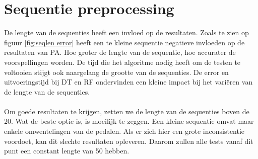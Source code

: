 \section{Sequentie preprocessing}
De lengte van de sequenties heeft een invloed op de resultaten. Zoals te zien op figuur \ref{fig:seqlen error} heeft een te kleine sequentie negatieve invloeden op de resultaten van PA. Hoe groter de lengte van de sequentie, hoe accurater de voorspellingen worden. De tijd die het algoritme nodig heeft om de testen te voltooien stijgt ook naargelang de grootte van de sequenties. De error en uitvoeringstijd bij DT en RF ondervinden een kleine impact bij het variëren van de lengte van de sequenties. 
\\\\
Om goede resultaten te krijgen, zetten we de lengte van de sequenties boven de 20. Wat de beste optie is, is moeilijk te zeggen. Een kleine sequentie omvat maar enkele omwentelingen van de pedalen. Als er zich hier een grote inconsistentie voordoet, kan dit slechte resultaten opleveren. Daarom zullen alle tests vanaf dit punt een constant lengte van 50 hebben. 
